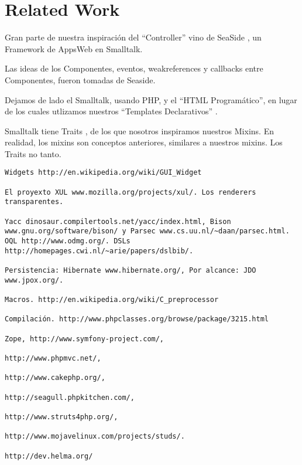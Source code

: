 \section{Related Work}

Gran parte de nuestra inspiración del ``Controller'' vino de SeaSide \cite{seaside}, un Framework de AppsWeb en Smalltalk.

Las ideas de los Componentes, eventos, weakreferences y callbacks entre Componentes, fueron tomadas de Seaside.

Dejamos de lado el Smalltalk, usando PHP, y el ``HTML Programático'', en lugar de los cuales utlizamos nuestros ``Templates Declarativos'' .

Smalltalk tiene Traits \cite{traits}, de los que nosotros inspiramos nuestros Mixins. En realidad, los mixins son conceptos anteriores, similares a nuestros mixins. Los Traits no tanto.
\begin{verbatim}
Widgets http://en.wikipedia.org/wiki/GUI_Widget

El proyexto XUL www.mozilla.org/projects/xul/. Los renderers transparentes.

Yacc dinosaur.compilertools.net/yacc/index.html, Bison www.gnu.org/software/bison/ y Parsec www.cs.uu.nl/~daan/parsec.html.
OQL http://www.odmg.org/. DSLs http://homepages.cwi.nl/~arie/papers/dslbib/.

Persistencia: Hibernate www.hibernate.org/, Por alcance: JDO www.jpox.org/.

Macros. http://en.wikipedia.org/wiki/C_preprocessor

Compilación. http://www.phpclasses.org/browse/package/3215.html

Zope, http://www.symfony-project.com/,

http://www.phpmvc.net/,

http://www.cakephp.org/,

http://seagull.phpkitchen.com/,

http://www.struts4php.org/,

http://www.mojavelinux.com/projects/studs/.

http://dev.helma.org/
\end{verbatim}

